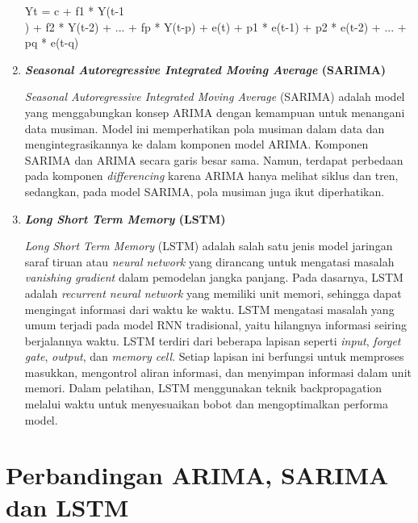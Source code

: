 \begin{enumerate}
    Yt = c + f1 * Y(t-1\\) + f2 * Y(t-2) + ... + fp * Y(t-p) + e(t) + p1 * e(t-1) + p2 * e(t-2) + ... + pq * e(t-q)

    \item \textbf{\textit{Seasonal Autoregressive Integrated Moving Average} (SARIMA)}
    
    \textit{Seasonal Autoregressive Integrated Moving Average} (SARIMA) adalah model yang menggabungkan konsep ARIMA dengan kemampuan untuk menangani data musiman. Model ini memperhatikan pola musiman dalam data dan mengintegrasikannya ke dalam komponen model ARIMA. Komponen SARIMA dan ARIMA secara garis besar sama. Namun, terdapat perbedaan pada komponen \textit{differencing} karena ARIMA hanya melihat siklus dan tren, sedangkan, pada model SARIMA, pola musiman juga ikut diperhatikan.

    \item \textbf{\textit{Long Short Term Memory} (LSTM)}
    
    \textit{Long Short Term Memory} (LSTM) adalah salah satu jenis model jaringan saraf tiruan atau \textit{neural network} yang dirancang untuk mengatasi masalah \textit{vanishing gradient} dalam pemodelan jangka panjang. Pada dasarnya, LSTM adalah \textit{recurrent neural network} yang memiliki unit memori, sehingga dapat mengingat informasi dari waktu ke waktu. LSTM mengatasi masalah yang umum terjadi pada model RNN tradisional, yaitu hilangnya informasi seiring berjalannya waktu. LSTM terdiri dari beberapa lapisan seperti \textit{input}, \textit{forget gate}, \textit{output}, dan \textit{memory cell}. Setiap lapisan ini berfungsi untuk memproses masukkan, mengontrol aliran informasi, dan menyimpan informasi dalam unit memori. Dalam pelatihan, LSTM menggunakan teknik backpropagation melalui waktu untuk menyesuaikan bobot dan mengoptimalkan performa model. 

\end{enumerate}

\section{Perbandingan ARIMA, SARIMA dan LSTM}

